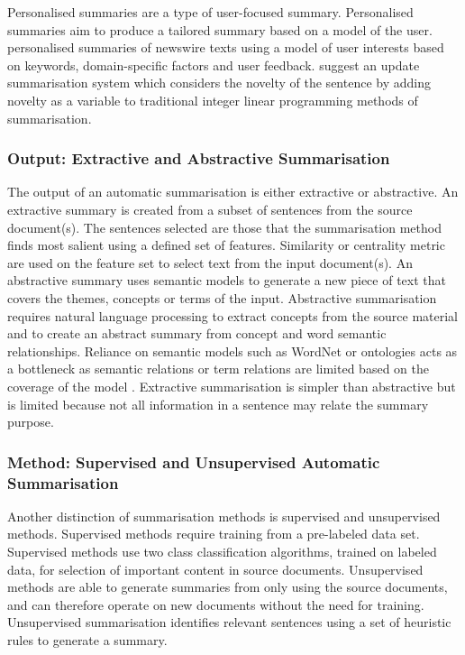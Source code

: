 Personalised summaries are a type of user-focused summary. Personalised summaries aim to produce a tailored summary based on a model of the user. \citet{diaz2007user} personalised summaries of newswire texts using a model of user interests based on keywords, domain-specific factors and user feedback. \citet{li-etal-2015-improving-update} suggest an update summarisation system which considers the novelty of the sentence by adding novelty as a variable to traditional integer linear programming methods of summarisation.


\subsubsection{Output: Extractive and Abstractive Summarisation}

The output of an automatic summarisation is either extractive or abstractive. An extractive summary is created from a subset of sentences from the source document(s). The sentences selected are those that the summarisation method finds most salient using a defined set of features. Similarity or centrality metric are used on the feature set to select text from the input document(s). An abstractive summary uses semantic models to generate a new piece of text that covers the themes, concepts or terms of the input. Abstractive summarisation requires natural language processing to extract concepts from the source material and to create an abstract summary from concept and word semantic relationships. Reliance on semantic models such as WordNet \citep{fellbaum2012wordnet} or ontologies acts as a bottleneck as semantic relations or term relations are limited based on the coverage of the model \citep{nenkova2012survey}. Extractive summarisation is simpler than abstractive but is limited because not all information in a sentence may relate the summary purpose. 

\subsubsection{Method: Supervised and Unsupervised Automatic Summarisation}

Another distinction of summarisation methods is supervised and unsupervised methods. Supervised methods require training from a pre-labeled data set. Supervised methods use two class classification algorithms, trained on labeled data, for selection of important content in source documents. Unsupervised methods are able to generate summaries from only using the source documents, and can therefore operate on new documents without the need for training. Unsupervised summarisation identifies relevant sentences using a set of heuristic rules to generate a summary.

